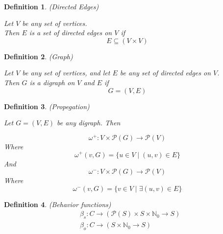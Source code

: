 \documentclass{article}
\newtheorem{defn}{Definition}[section]
\begin{document}
\medskip

\begin{defn} (Directed Edges)
	
	Let \(V\) be any set of vertices. \\
	Then \(E\) is a set of directed edges on \(V\) if 
	\begin{equation}
		E \subseteq (V \times V)
	\end{equation}
\end{defn}

\medskip

\begin{defn} (Graph)
	
		Let \(V\) be any set of vertices, and let \(E\) be any set of directed edges on \(V\). \\
		Then \(G\) is a digraph on \(V\) and \(E\) if
		\begin{equation}
			G = (V, E)
		\end{equation}
\end{defn}

\medskip

\begin{defn} (Propegation)
	
Let \(G = (V, E)\) be any digraph. Then

\begin{equation}
	\omega^+ : V \times \mathcal{P}(G) \rightarrow \mathcal{P}(V) 
\end{equation}
Where
\begin{equation*}
	\omega^+(v, G) = 
	\{u \in V \mid (u, v) \in E\}
\end{equation*}
And
\begin{equation}
	\omega^- : V \times \mathcal{P}(G) \rightarrow \mathcal{P}(V) 
\end{equation}
Where
\begin{equation*}
	\omega^-(v, G) = 
	\{v \in V \mid \exists (u, v) \in E\}
\end{equation*}

\end{defn}

\medskip

\begin{defn} (Behavior functions)
\begin{align}
	& \beta_{s} : C \to (\mathcal{P}(S) \times S \times \mathbb{N}_{0} \to S) \\
	& \beta_{o} : C \to (S \times \mathbb{N}_{0} \to S)
\end{align}

\end{defn}
\end{document}
